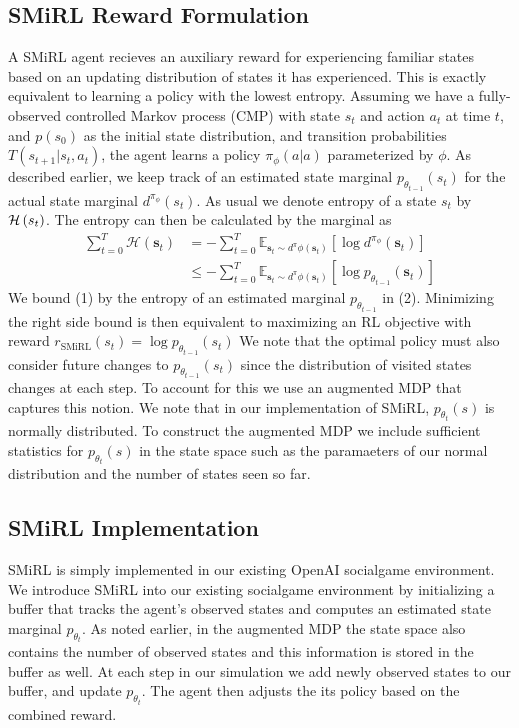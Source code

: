 \subsection{SMiRL Reward Formulation}
A SMiRL agent recieves an auxiliary reward for 
experiencing familiar states based on an updating distribution of states it has experienced. 
This is exactly equivalent to learning a policy with the lowest entropy. 
Assuming we have a fully-observed controlled Markov process (CMP) with state $ s_t $ and action $ a_t $
at time $ t $, and $ p(s_0) $ as the initial state distribution, and transition probabilities 
$ T(s_{t+1} | s_t, a_t) $, the agent learns a policy $ \pi_\phi (a | a) $ parameterized by 
$ \phi $. 
As described earlier, we keep track of an estimated state marginal $ p_{\theta_{t-1}} (s_t) $ 
for the actual state marginal $ d^{\pi_\phi} (s_t) $. 
As usual we denote entropy of a state $ s_t $ by $ \mathcal{H}\left( s_t \right) $. 
The entropy can then be calculated by the marginal as 
\begin{align}
    \sum_{t=0}^{T} \mathcal{H}\left(\mathbf{s}_{t}\right)
    &= -\sum_{t=0}^{T} \mathbb{E}_{\mathbf{s}_{t} \sim d^{\pi} \phi\left(\mathbf{s}_{t}\right)}\left[\log d^{\pi_{\phi}}\left(\mathbf{s}_{t}\right)\right] \\
    &\leq-\sum_{t=0}^{T} \mathbb{E}_{\mathbf{s}_{t} \sim d^{\pi} \phi\left(\mathbf{s}_{t}\right)}\left[\log p_{\theta_{t-1}}\left(\mathbf{s}_{t}\right)\right] 
\end{align}
We bound (1) by the entropy of an estimated marginal $ p_{\theta_{t-1}} $ in (2).
Minimizing the right side bound is then equivalent to maximizing an RL objective with reward 
$ r_{\text{SMiRL}}(s_t) = \log p_{\theta_{t-1}} (s_t)  $
We note that the optimal policy must also consider future changes to $ p_{\theta_{t-1}} (s_t) $
since the distribution of visited states changes at each step. 
To account for this we use an augmented MDP that captures this notion. \citep{smirl}
We note that in our implementation of SMiRL, $ p_{\theta_t} (s) $ is normally distributed. 
To construct the augmented MDP we include sufficient statistics for $ p_{\theta_t} (s)$ 
in the state space such as the paramaeters of our normal distribution and the number of states 
seen so far. 

\subsection{SMiRL Implementation}
SMiRL is simply implemented in our existing OpenAI socialgame environment. 
We introduce SMiRL into our existing socialgame environment by initializing a 
buffer that tracks the agent's observed states and computes an estimated state marginal $ p_{\theta_t} $. 
As noted earlier, in the augmented MDP the state space also contains the number of observed states and this information is stored in the buffer as well. 
At each step in our simulation we add newly observed states to our buffer, and update $p_{\theta_t}$. The agent then adjusts the its policy based on the combined reward. 


